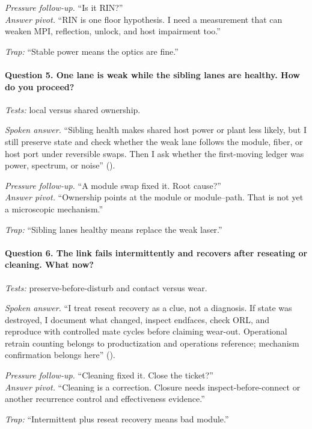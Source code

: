 \textit{Pressure follow-up.} ``Is it RIN?''\\
\textit{Answer pivot.} ``RIN is one floor hypothesis. I need a measurement that
can weaken MPI, reflection, unlock, and host impairment too.''

\textit{Trap:} ``Stable power means the optics are fine.''

\paragraph{Question 5. One lane is weak while the sibling lanes are healthy. How
do you proceed?}
\textit{Tests:} local versus shared ownership.

\textit{Spoken answer.}
``Sibling health makes shared host power or plant less likely, but I still
preserve state and check whether the weak lane follows the module, fiber, or
host port under reversible swaps. Then I ask whether the first-moving ledger
was power, spectrum, or noise'' ().

\textit{Pressure follow-up.} ``A module swap fixed it. Root cause?''\\
\textit{Answer pivot.} ``Ownership points at the module or module--path. That
is not yet a microscopic mechanism.''

\textit{Trap:} ``Sibling lanes healthy means replace the weak laser.''

\paragraph{Question 6. The link fails intermittently and recovers after reseating
or cleaning. What now?}
\textit{Tests:} preserve-before-disturb and contact versus wear.

\textit{Spoken answer.}
``I treat reseat recovery as a clue, not a diagnosis. If state was destroyed, I
document what changed, inspect endfaces, check ORL, and reproduce with controlled
mate cycles before claiming wear-out. Operational retrain counting belongs to
productization and operations reference; mechanism confirmation belongs here''
().

\textit{Pressure follow-up.} ``Cleaning fixed it. Close the ticket?''\\
\textit{Answer pivot.} ``Cleaning is a correction. Closure needs
inspect-before-connect or another recurrence control and effectiveness
evidence.''

\textit{Trap:} ``Intermittent plus reseat recovery means bad module.''


